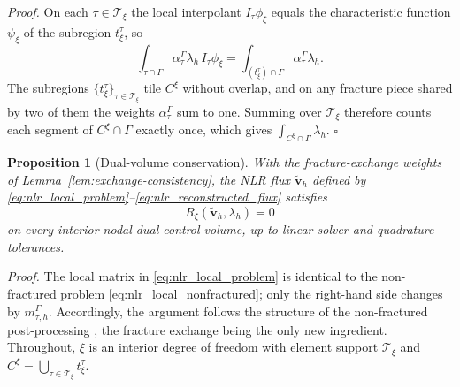 \documentclass[a4paper,fleqn]{cas-sc}
\newcommand{\vflux}{\mathbf{v}}
\newtheorem{proposition}[theorem]{Proposition}
\begin{document}
\noindent\emph{Proof.}
On each \(\tau\in\mathcal{T}_\xi\) the local interpolant \(I_\tau\phi_\xi\)
equals the characteristic function \(\psi_\xi\) of the subregion \(t_\xi^\tau\),
so
\[
\int_{\tau\cap\Gamma}\alpha_\tau^\Gamma\lambda_h\,I_\tau\phi_\xi
=
\int_{(t_\xi^\tau)\cap\Gamma}\alpha_\tau^\Gamma\lambda_h .
\]
The subregions \(\{t_\xi^\tau\}_{\tau\in\mathcal{T}_\xi}\) tile \(C^\xi\) without
overlap, and on any fracture piece shared by two of them the weights
\(\alpha_\tau^\Gamma\) sum to one. Summing over \(\mathcal{T}_\xi\) therefore
counts each segment of \(C^\xi\cap\Gamma\) exactly once, which gives
\(\int_{C^\xi\cap\Gamma}\lambda_h\). \(\square\)

\begin{proposition}[Dual-volume conservation]
\label{prop:dual-volume-conservation}
With the fracture-exchange weights of Lemma~\ref{lem:exchange-consistency}, the
NLR flux \(\widetilde{\vflux}_h\) defined by
\eqref{eq:nlr_local_problem}--\eqref{eq:nlr_reconstructed_flux} satisfies
\[
  R_\xi(\widetilde{\vflux}_h,\lambda_h)=0
\]
on every interior nodal dual control volume, up to linear-solver and quadrature
tolerances.
\end{proposition}

\noindent\emph{Proof.}
The local matrix in \eqref{eq:nlr_local_problem} is identical to the
non-fractured problem \eqref{eq:nlr_local_nonfractured}; only the right-hand
side changes by \(m_{\tau,h}^\Gamma\). Accordingly, the argument follows the
structure of the non-fractured post-processing \citep{DENG2019166}, the fracture
exchange being the only new ingredient. Throughout, \(\xi\) is an interior degree
of freedom with element support \(\mathcal{T}_\xi\) and
\(C^\xi=\bigcup_{\tau\in\mathcal{T}_\xi}t_\xi^\tau\).
\end{document}
